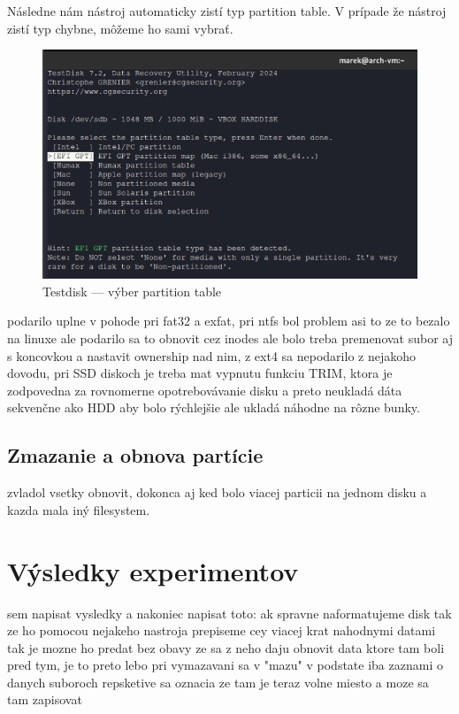 \documentclass[12pt,oneside,slovak,a4paper]{article}
\begin{document}
Následne nám nástroj automaticky zistí typ partition table. V prípade že nástroj zistí typ chybne, môžeme ho sami vybrať.

\begin{figure}[H]
	\centering
	\includegraphics[scale=0.8]{./images/testdisk_testing/choose_partition_table.png}
	\centering
	\captionsetup{justification=centering,margin=2cm}
	\caption{Testdisk --- výber partition table}
\end{figure}



podarilo uplne v pohode pri fat32 a exfat, pri ntfs bol problem asi to ze to bezalo na linuxe ale podarilo sa to obnovit cez inodes ale bolo treba premenovat subor aj s koncovkou a nastavit ownership nad nim, z ext4 sa nepodarilo z nejakoho dovodu, pri SSD diskoch je treba mat vypnutu funkciu TRIM, ktora je zodpovedna za rovnomerne opotrebovávanie disku a preto neukladá dáta sekvenčne ako HDD aby bolo rýchlejšie ale ukladá náhodne na rôzne bunky.


\subsection{Zmazanie a obnova partície}
zvladol vsetky obnovit, dokonca aj ked bolo viacej particii na jednom disku a kazda mala iný filesystem.

\section{Výsledky experimentov}
sem napisat vysledky a nakoniec napisat toto: ak spravne naformatujeme disk tak ze ho pomocou nejakeho nastroja prepiseme cey viacej krat nahodnymi datami tak je mozne ho predat bez obavy ze sa z neho daju obnovit data ktore tam boli pred tym, je to preto lebo pri vymazavani sa v "mazu" v podstate iba zaznami o danych suboroch repsketive sa oznacia ze tam je teraz volne miesto a moze sa tam zapisovat
\end{document}
